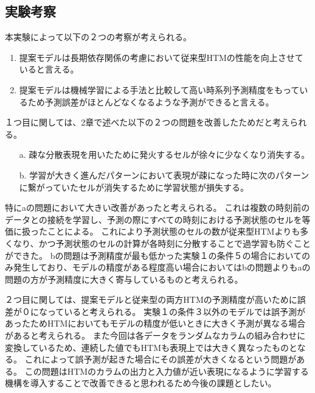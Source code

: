 \newpage
\vspace{3cm}
\subsection{実験考察}
本実験によって以下の２つの考察が考えられる。
\begin{enumerate}
  \item 提案モデルは長期依存関係の考慮において従来型HTMの性能を向上させていると言える。
  \item 提案モデルは機械学習による手法と比較して高い時系列予測精度をもっているため予測誤差がほとんどなくなるような予測ができると言える。
\end{enumerate}
１つ目に関しては、2章で述べた以下の２つの問題を改善したためだと考えられる。
\begin{itemize}
  \item[a.] 疎な分散表現を用いたために発火するセルが徐々に少なくなり消失する。
  \item[b.] 学習が大きく進んだパターンにおいて表現が疎になった時に次のパターンに繋がっていたセルが消失するために学習状態が損失する。
\end{itemize}
特にaの問題において大きい改善があったと考えられる。
これは複数の時刻前のデータとの接続を学習し、予測の際にすべての時刻における予測状態のセルを等価に扱ったことによる。
これにより予測状態のセルの数が従来型HTMよりも多くなり、かつ予測状態のセルの計算が各時刻に分散することで過学習も防ぐことができた。
bの問題は予測精度が最も低かった実験１の条件５の場合においてのみ発生しており、モデルの精度がある程度高い場合においてはbの問題よりもaの問題の方が予測精度に大きく寄与しているものと考えられる。

２つ目に関しては、提案モデルと従来型の両方HTMの予測精度が高いために誤差が０になっていると考えられる。
実験１の条件３以外のモデルでは誤予測があったためHTMにおいてもモデルの精度が低いときに大きく予測が異なる場合があると考えられる。
また今回は各データをランダムなカラムの組み合わせに変換しているため、連続した値でもHTMも表現上では大きく異なったものとなる。
これによって誤予測が起きた場合にその誤差が大きくなるという問題がある。
この問題はHTMのカラムの出力と入力値が近い表現になるように学習する機構を導入することで改善できると思われるため今後の課題としたい。
